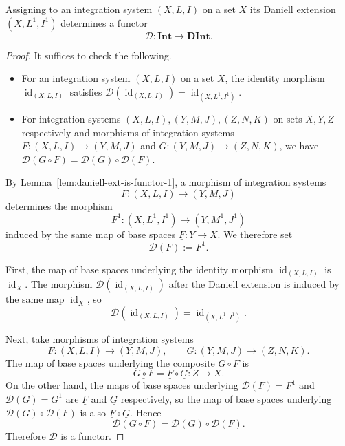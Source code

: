 \begin{lemma}\label{lem:daniell-ext-is-functor-2}
  Assigning to an integration system $(X,L,I)$ on a set $X$ its Daniell
  extension $(X,L^1,I^1)$ determines a functor
  \[
    \mathcal{D}:\mathbf{Int}\to\mathbf{DInt} .
  \]
\end{lemma}
\begin{proof}
  It suffices to check the following.
  \begin{itemize}
    \item For an integration system $(X,L,I)$ on a set $X$, the
      identity morphism $\operatorname{id}_{(X,L,I)}$ satisfies
      $\mathcal{D}(\operatorname{id}_{(X,L,I)})=\operatorname{id}_{(X,L^1,I^1)}$.
    \item For integration systems $(X,L,I),(Y,M,J),(Z,N,K)$ on sets
      $X,Y,Z$ respectively and morphisms of integration systems
      $F:(X,L,I)\to(Y,M,J)$ and $G:(Y,M,J)\to(Z,N,K)$, we have
      $\mathcal{D}(G\circ F)=\mathcal{D}(G)\circ\mathcal{D}(F)$.
  \end{itemize}

  By Lemma~\ref{lem:daniell-ext-is-functor-1}, a morphism of integration systems
  \[
    F:(X,L,I)\to(Y,M,J)
  \]
  determines the morphism
  \[
    F^1:(X,L^1,I^1)\to(Y,M^1,J^1)
  \]
  induced by the same map of base spaces $\underline{F}:Y\to X$. We therefore
  set
  \[
    \mathcal{D}(F):=F^1 .
  \]

  First, the map of base spaces underlying the identity morphism
  $\operatorname{id}_{(X,L,I)}$ is $\operatorname{id}_X$. The morphism
  $\mathcal{D}(\operatorname{id}_{(X,L,I)})$ after the Daniell extension is
  induced by the same map $\operatorname{id}_X$, so
  \[
    \mathcal{D}(\operatorname{id}_{(X,L,I)})
    =\operatorname{id}_{(X,L^1,I^1)} .
  \]

  Next, take morphisms of integration systems
  \[
    F:(X,L,I)\to(Y,M,J),
    \qquad
    G:(Y,M,J)\to(Z,N,K) .
  \]
  The map of base spaces underlying the composite $G\circ F$ is
  \[
    \underline{G\circ F}=\underline{F}\circ\underline{G}:Z\to X .
  \]
  On the other hand, the maps of base spaces underlying
  $\mathcal{D}(F)=F^1$ and $\mathcal{D}(G)=G^1$ are $\underline{F}$ and
  $\underline{G}$ respectively, so the map of base spaces underlying
  $\mathcal{D}(G)\circ\mathcal{D}(F)$ is also
  $\underline{F}\circ\underline{G}$. Hence
  \[
    \mathcal{D}(G\circ F)
    =\mathcal{D}(G)\circ\mathcal{D}(F) .
  \]
  Therefore $\mathcal{D}$ is a functor.
\end{proof}
